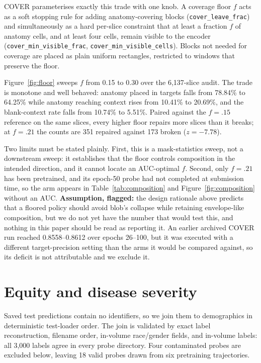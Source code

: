 \documentclass{article}
\begin{document}
COVER parameterises exactly this trade with one knob. A coverage floor $f$ acts
as a soft stopping rule for adding anatomy-covering blocks
(\texttt{cover\_leave\_frac}) and simultaneously as a hard per-slice constraint
that at least a fraction $f$ of anatomy cells, and at least four cells, remain
visible to the encoder (\texttt{cover\_min\_visible\_frac},
\texttt{cover\_min\_visible\_cells}). Blocks not needed for coverage are placed
as plain uniform rectangles, restricted to windows that preserve the floor.

Figure~\ref{fig:floor} sweeps $f$ from 0.15 to 0.30 over the 6{,}137-slice
audit. The trade is monotone and well behaved: anatomy placed in targets falls
from 78.84\% to 64.25\% while anatomy reaching context rises from 10.41\% to
20.69\%, and the blank-context rate falls from 10.74\% to 5.51\%. Paired
against the $f{=}.15$ reference on the same slices, every higher floor repairs
more slices than it breaks; at $f{=}.21$ the counts are 351 repaired against
173 broken ($z=-7.78$).

Two limits must be stated plainly. First, this is a mask-statistics sweep, not
a downstream sweep: it establishes that the floor controls composition in the
intended direction, and it cannot locate an AUC-optimal $f$. Second, only
$f{=}.21$ has been pretrained, and its epoch-50 probe had not completed at
submission time, so the arm appears in Table~\ref{tab:composition} and
Figure~\ref{fig:composition} without an AUC. \textbf{Assumption, flagged:} the
design rationale above predicts that a floored policy should avoid blob's
collapse while retaining envelope-like composition, but we do not yet have the
number that would test this, and nothing in this paper should be read as
reporting it. An earlier archived COVER run reached 0.8558--0.8612 over epochs
26--100, but it was executed with a different target-precision setting than the
arms it would be compared against, so its deficit is not attributable and we
exclude it.

\section{Equity and disease severity}

Saved test predictions contain no identifiers, so we join them to demographics
in deterministic test-loader order. The join is validated by exact label
reconstruction, filename order, in-volume race/gender fields, and in-volume
labels: all 3,000 labels agree in every probe directory. Four contaminated
probes are excluded below, leaving 18 valid probes drawn from six pretraining
trajectories.
\end{document}
